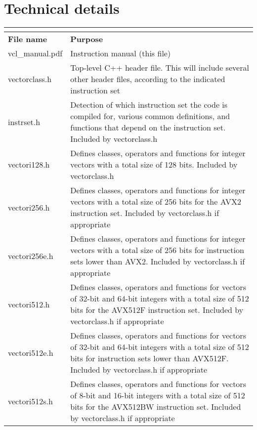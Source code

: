 \documentclass[vcl_manual.tex]{subfiles}
\begin{document}
\chapter{Technical details}\label{chap:TechnicalDetails}
\flushleft

\begin{longtable}[l]{|p{40mm}|p{100mm}|}
\endfirsthead
\label{table:fileList} \\
\endhead
\hline
\bfseries File name & \bfseries Purpose \\ \hline
vcl\_manual.pdf & Instruction manual (this file) \\ \hline

vectorclass.h & Top-level C++ header file. This will include several other header files, according to the indicated instruction set \\ \hline

instrset.h & Detection of which instruction set the code is compiled for,  various common definitions, and functions that depend on the instruction set. Included by vectorclass.h \\ \hline

vectori128.h & Defines classes, operators and functions for integer vectors with a total size of 128 bits. Included by vectorclass.h \\ \hline

vectori256.h & Defines classes, operators and functions for integer vectors with a total size of 256 bits for the AVX2 instruction set. Included by vectorclass.h if appropriate \\ \hline

vectori256e.h & Defines classes, operators and functions for integer vectors with a total size of 256 bits for instruction sets lower than AVX2. Included by vectorclass.h if appropriate \\ \hline

vectori512.h & Defines classes, operators and functions for vectors of 32-bit and 64-bit integers with a total size of 512 bits for the AVX512F instruction set. Included by vectorclass.h if appropriate \\ \hline

vectori512e.h & Defines classes, operators and functions for vectors of 32-bit and 64-bit integers with a total size of 512 bits for instruction sets lower than AVX512F. Included by vectorclass.h if appropriate \\ \hline

vectori512s.h & Defines classes, operators and functions for vectors of 8-bit and 16-bit integers with a total size of 512 bits for the AVX512BW instruction set. Included by vectorclass.h if appropriate \\ \hline


\end{longtable}
\end{document}
